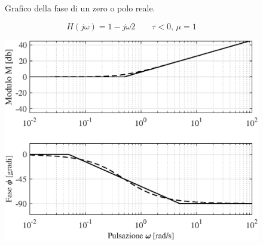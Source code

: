 \begin{figure}[H]
	\centering
	 \quad
	\caption{ Grafico della fase di un zero o polo reale. }
	\label{fig:bodezpr-fas}
\end{figure}

\begin{nexample}
	\[ H(j\omega) = 1-j\omega2 \qquad\tau<0, \, \mu = 1 \]
\begin{figure}[H]
	\centering
	\includegraphics[width=0.7\linewidth]{immagini/cap6_Bode/es3.eps}
	\label{fig:Bode_es3}
\end{figure}	
\end{nexample}


